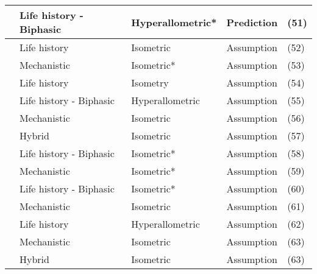 \documentclass[a4paper]{article} %
\begin{document}
\begin{table}[]
\begin{tabular}{|l|l|l|l|l|}
        \autocite{Quince2008b}                  & Life history - Biphasic   & Hyperallometric* & Prediction                        & (51)          \\ \hline
        \autocite{Pecquerie2009}                & Life history              & Isometric        & Assumption                        & (52)          \\ \hline
        \autocite{kooijman2010dynamic}          & Mechanistic               & Isometric*       & Assumption                        & (53)          \\ \hline
        \autocite{Arendt2011}                   & Life history              & Isometry         & Assumption                        & (54)          \\ \hline
        \autocite{Ohnishi2011}                  & Life history - Biphasic   & Hyperallometric  & Assumption                        & (55)          \\ \hline
        \autocite{Brunel2013}                   & Mechanistic               & Isometric        & Assumption                        & (56)          \\ \hline
        \autocite{Charnov2013}                  & Hybrid                    & Isometric        & Assumption                        & (57)          \\ \hline
        \autocite{Boukal2014}                   & Life history - Biphasic   & Isometric*       & Assumption                        & (58)          \\ \hline
        \autocite{Kooijman2014a}                & Mechanistic               & Isometric*       & Assumption                        & (59)          \\ \hline
        \autocite{Minte-Vera2016a}              & Life history - Biphasic   & Isometric*       & Assumption                        & (60)          \\ \hline
        \autocite{Jusup2017}                    & Mechanistic               & Isometric        & Assumption                        & (61)          \\ \hline
        \autocite{Mangel2017}                   & Life history              & Hyperallometric  & Assumption                        & (62)          \\ \hline
        \autocite{Smallegange2017}              & Mechanistic               & Isometric        & Assumption                        & (63)          \\ \hline
        \autocite{Audzijonyte2018}              & Hybrid                    & Isometric        & Assumption                        & (63)          \\ \hline

\end{tabular}
\end{table}
\end{document}
